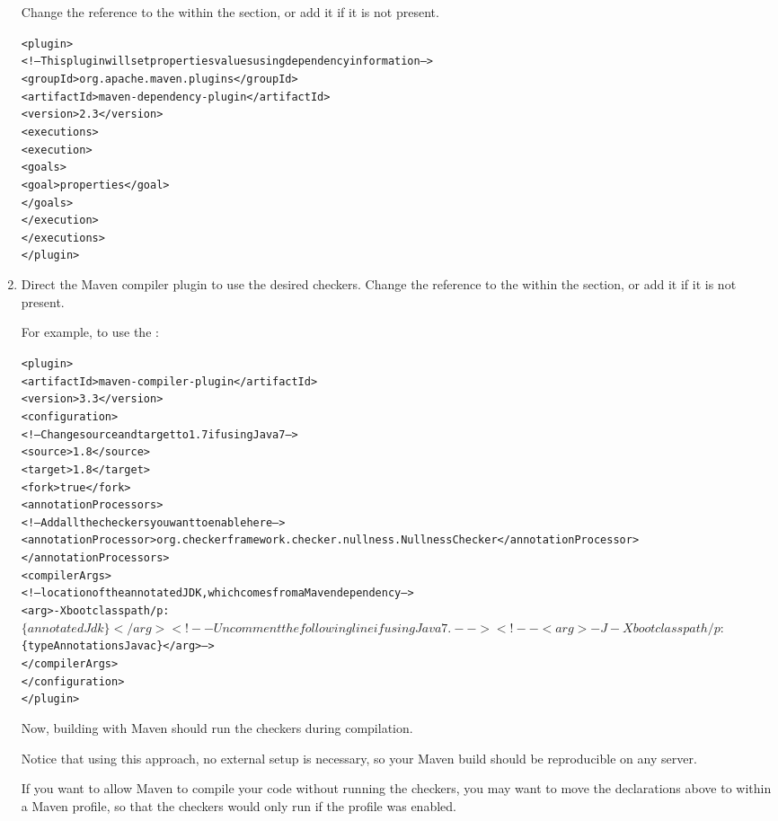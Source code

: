 \begin{enumerate}
Change the reference to the  within the 
section, or add it if it is not present.

\begin{alltt}
    <plugin>
        <!-- This plugin will set properties values using dependency information -->
        <groupId>org.apache.maven.plugins</groupId>
        <artifactId>maven-dependency-plugin</artifactId>
        <version>2.3</version>
        <executions>
            <execution>
                <goals>
                    <goal>properties</goal>
                </goals>
            </execution>
        </executions>
    </plugin>
\end{alltt}


\item Direct the Maven compiler plugin to use the desired checkers.
Change the reference to the  within the 
section, or add it if it is not present.

For example, to use the :

\begin{smaller}
\begin{alltt}
    <plugin>
        <artifactId>maven-compiler-plugin</artifactId>
        <version>3.3</version>
        <configuration>
            <!-- Change source and target to 1.7 if using Java 7 -->
            <source>1.8</source>
            <target>1.8</target>
            <fork>true</fork>
            <annotationProcessors>
                <!-- Add all the checkers you want to enable here -->
                <annotationProcessor>org.checkerframework.checker.nullness.NullnessChecker</annotationProcessor>
            </annotationProcessors>
            <compilerArgs>
                <!-- location of the annotated JDK, which comes from a Maven dependency -->
                <arg>-Xbootclasspath/p:$\{annotatedJdk\}</arg>
                <!-- Uncomment the following line if using Java 7. -->
                <!-- <arg>-J-Xbootclasspath/p:$\{typeAnnotationsJavac\}</arg> -->
            </compilerArgs>
        </configuration>
    </plugin>
\end{alltt}
\end{smaller}

Now, building with Maven should run the checkers during compilation.

Notice that using this approach, no external setup is necessary,
so your Maven build should be reproducible on any server.

If you want to allow Maven to compile your code without running the checkers, you may
want to move the declarations above to within a Maven profile, so that the checkers
would only run if the profile was enabled.

\end{enumerate}



